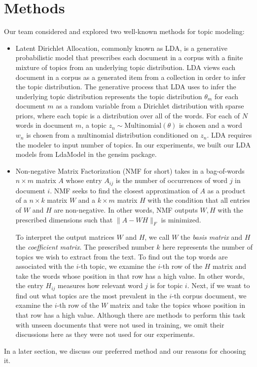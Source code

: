 \section{Methods}
Our team considered and explored two well-known methods for topic modeling:
    \begin{itemize}
        \item Latent Dirichlet Allocation, commonly known as LDA, is a generative probabilistic model that prescribes each document in a corpus with a finite mixture of topics from an underlying topic distribution. LDA views each document in a corpus as a generated item from a collection in order to infer the topic distribution. The generative process that LDA uses to infer the underlying topic distribution represents the topic distribution $\theta_m$ for each document $m$ as a random variable from a Dirichlet distribution with sparse priors, where each topic is a distribution over all of the words. For each of $N$ words in document $m$, a topic $z_n \sim \text{Multinomial}(\theta)$ is chosen and a word $w_n$ is chosen from a multinomial distribution conditioned on $z_n$. LDA requires the modeler to input number of topics. In our experiments, we built our LDA models from LdaModel in the gensim package. 

        \item Non-negative Matrix Factorization (NMF for short) takes in a bag-of-words $n\times m$ matrix $A$ whose entry $A_{ij}$ is the number of occurrences of word $j$ in document $i$. NMF seeks to find the closest approximation of $A$ as a product of a $n\times k$ matrix $W$ and a $k\times m$ matrix $H$ with the condition that all entries of $W$ and $H$ are non-negative. In other words, NMF outputs $W,H$ with the prescribed dimensions such that $\|A-WH\|_F$ is minimized.
        
        To interpret the output matrices $W$ and $H$, we call $W$ the \textit{basis matrix} and $H$ the \textit{coefficient matrix}. The prescribed number $k$ here represents the number of topics we wish to extract from the text. To find out the top words are associated with the $i$-th topic, we examine the $i$-th row of the $H$ matrix and take the words whose position in that row has a high value. In other words, the entry $H_{ij}$ measures how relevant word $j$ is for topic $i$. Next, if we want to find out what topics are the most prevalent in the $i$-th corpus document, we examine the $i$-th row of the $W$ matrix and take the topics whose position in that row has a high value. Although there are methods to perform this task with unseen documents that were not used in training, we omit their discussions here as they were not used for our experiments.
    \end{itemize}
In a later section, we discuss our preferred method and our reasons for choosing it.


